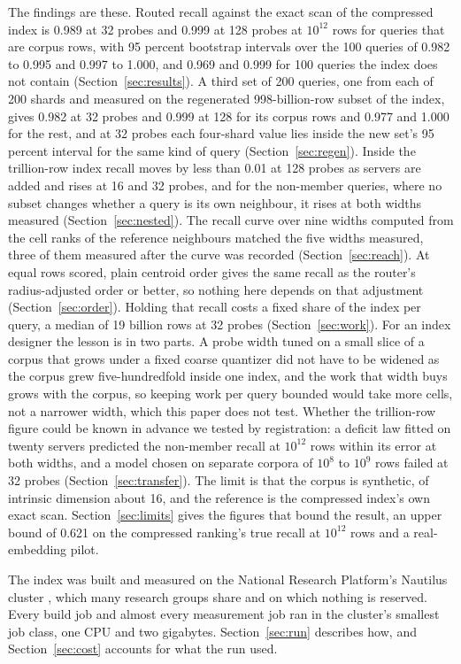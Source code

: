 \documentclass[sigconf, nonacm]{acmart}
\begin{document}
The findings are these. Routed recall against the exact scan of the compressed index is 0.989 at 32 probes and 0.999 at
128 probes at $10^{12}$ rows for queries that are corpus rows, with 95 percent bootstrap intervals
over the 100 queries of 0.982 to 0.995 and 0.997 to 1.000, and 0.969 and 0.999 for 100 queries the
index does not contain (Section~\ref{sec:results}). A third set of 200 queries, one from each of
200 shards and measured on the regenerated 998-billion-row subset of the index, gives 0.982 at 32
probes and 0.999 at
128 for its corpus rows and 0.977 and 1.000 for the rest, and at 32 probes each four-shard value
lies inside the new set's 95 percent interval for the same kind of query (Section~\ref{sec:regen}). Inside the trillion-row
index recall moves by less than 0.01 at 128 probes as servers are added and rises at 16 and 32
probes, and for the non-member queries, where no subset changes whether a query is its own
neighbour, it rises at both widths measured (Section~\ref{sec:nested}). The recall curve over nine
widths computed from the cell ranks of the reference neighbours matched the five widths measured,
three of them measured after the curve was recorded (Section~\ref{sec:reach}). At equal rows
scored, plain centroid order gives the same recall as the router's radius-adjusted order or better,
so nothing here depends on that adjustment (Section~\ref{sec:order}). Holding that recall costs a
fixed share of the index per query, a median of 19 billion rows at 32 probes
(Section~\ref{sec:work}). For an index designer the lesson is in two parts. A probe width tuned on a
small slice of a corpus that grows under a fixed coarse quantizer did not have to be widened as the
corpus grew five-hundredfold inside one index, and the work that width buys grows with the corpus,
so keeping work per query bounded would take more cells, not a narrower width, which this paper
does not test. Whether the trillion-row figure could be known in advance we tested by registration:
a deficit law fitted on twenty servers predicted the non-member recall at $10^{12}$ rows within
its error at both widths, and a model chosen on separate corpora of $10^{8}$ to $10^{9}$ rows failed
at 32 probes (Section~\ref{sec:transfer}). The limit is that the
corpus is synthetic, of intrinsic dimension about 16, and the reference is the compressed index's
own exact scan. Section~\ref{sec:limits} gives the figures that bound the result, an upper bound of
0.621 on the compressed ranking's true recall at $10^{12}$ rows and a real-embedding pilot.

The index was built and measured on the National Research Platform's Nautilus cluster
\cite{weitzel2025nrp}, which many research groups share and on which nothing is reserved. Every
build job and almost every measurement job ran in the cluster's smallest job class, one CPU and two
gigabytes. Section~\ref{sec:run} describes how, and Section~\ref{sec:cost} accounts for what the run
used.
\end{document}
